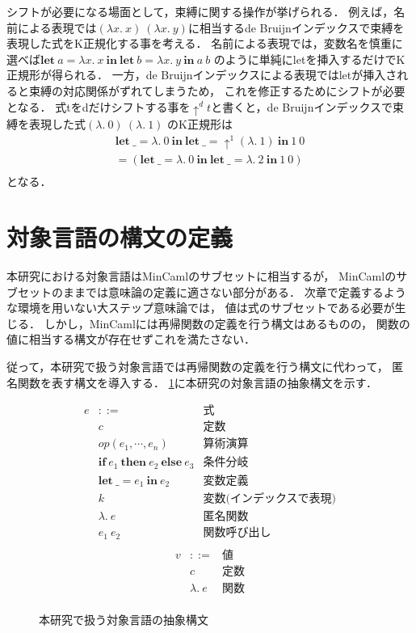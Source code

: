 \documentclass{sumiilab-paper}
\newcommand{\keyword}[1]{\mathbf{#1}}
\newcommand{\IF}{\keyword{if}}
\newcommand{\THEN}{\keyword{then}}
\newcommand{\ELSE}{\keyword{else}}
\newcommand{\LET}{\keyword{let}}
\newcommand{\IN}{\keyword{in}}
\begin{document}
シフトが必要になる場面として，束縛に関する操作が挙げられる．
例えば，名前による表現では$(\lambda x.~x)~(\lambda x.~y)$に相当するde Bruijnインデックスで束縛を表現した式をK正規化する事を考える．
名前による表現では，変数名を慎重に選べば$\LET~a = \lambda x.~x~\IN~\LET~b = \lambda x.~y~\IN~a~b$
のように単純にletを挿入するだけでK正規形が得られる．
一方，de Bruijnインデックスによる表現ではletが挿入されると束縛の対応関係がずれてしまうため，
これを修正するためにシフトが必要となる．
式tをdだけシフトする事を$\uparrow^d t$と書くと，de Bruijnインデックスで束縛を表現した式$(\lambda.~0)~(\lambda.~1)$
のK正規形は
\[ 
	\begin{array}{l}
		\LET~\_ = \lambda.~0~\IN~\LET~\_ = \uparrow^1(\lambda.~1)~\IN~1~0 \\
		= (\LET~\_ = \lambda.~0~\IN~\LET~\_ = \lambda.~2~\IN~1~0) \\
	\end{array}
\]
となる．

\section{対象言語の構文の定義}
本研究における対象言語はMinCamlのサブセットに相当するが，
MinCamlのサブセットのままでは意味論の定義に適さない部分がある．
次章で定義するような環境を用いない大ステップ意味論では，
値は式のサブセットである必要が生じる．
しかし，MinCamlには再帰関数の定義を行う構文はあるものの，
関数の値に相当する構文が存在せずこれを満たさない．

従って，本研究で扱う対象言語では再帰関数の定義を行う構文に代わって，
匿名関数を表す構文を導入する．
\figurename\ref{eqn:target-language-ast}に本研究の対象言語の抽象構文を示す．

\begin{figure}[htbp]
	\[ \begin{array}{lll}
			e & ::= & \mbox{式} \\
				& c	& \mbox{定数} \\
			 	& \textit{op} (e_1,\cdots,e_n) & \mbox{算術演算} \\
				& \IF~e_1~\THEN~e_2~\ELSE~e_3 & \mbox{条件分岐} \\
			 	& \LET~\_=e_1~\IN~e_2 & \mbox{変数定義} \\
				& k & \mbox{変数(インデックスで表現)} \\
				& \lambda.~e & \mbox{匿名関数} \\
				& e_1~e_2 & \mbox{関数呼び出し} \\
	\end{array} \]
	\[ \begin{array}{lll}
			v & ::= & \mbox{値} \\
				& c	& \mbox{定数} \\
				& \lambda.~e & \mbox{関数} \\
	\end{array} \]
	\caption{本研究で扱う対象言語の抽象構文}
	\label{eqn:target-language-ast}
\end{figure}
\end{document}
